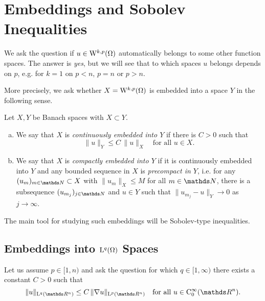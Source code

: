 \chapter{Embeddings and Sobolev Inequalities}

We ask the question if $u \in \mathrm{W}^{k,p}(\Omega)$ automatically belongs to some other function spaces.
The answer is \emph{yes}, but we will see that to which spaces $u$ belongs depends on $p$, e.g. for $k = 1$ on $p < n$, $p = n$ or $p > n$.

More precisely, we ask whether $X = \mathrm{W}^{k,p}(\Omega)$ is embedded into a space $Y$ in the following sense.

\begin{defn}
  \label{defn:embedding}
  Let $X, Y$ be Banach spaces with $X \subset Y$.
  \begin{enumerate}[a)]
    \item We say that $X$ is \emph{continuously embedded into $Y$} if there is $C > 0$ such that
      $$
      \|u\|_Y \leq C \, \|u\|_X \quad\text{for all } u \in X.
      $$
    \item We say that $X$ is \emph{compactly embedded into $Y$} if it is continuously embedded into $Y$ and any bounded sequence in $X$ is \emph{precompact in $Y$}, i.e. for any $(u_m)_{m \in \N} \subset X$ with $\|u_m\|_X \leq M$ for all $m \in \N$, there is a subsequence $(u_{m_j})_{j \in \N}$ and $u \in Y$ such that $\|u_{m_j} - u\|_Y \to 0$ as $j \to \infty$.
  \end{enumerate}
\end{defn}

The main tool for studying such embeddings will be Sobolev-type inequalities.

\section{Embeddings into \texorpdfstring{$\mathrm{L}^q(\Omega)$}{L\textasciicircum q(Omega)} Spaces}
\label{sec:lpEmbedding}

Let us assume $p \in [1,n)$ and ask the question for which $q \in [1,\infty)$ there exists a constant $C > 0$ such that
\begin{equation}
  \label{eq:sobolevTypeIneq}
  \|u\|_{\Ell^q(\R^n)} \leq C \, \|\nabla u\|_{\Ell^p(\R^n)} \quad\text{for all } u \in \CC_0^\infty(\R^n). 
\end{equation}

